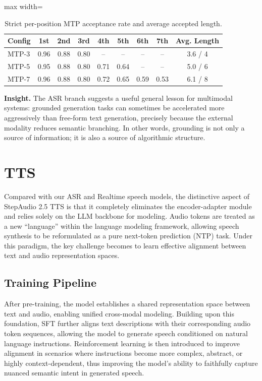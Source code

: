 \documentclass{llmxive}
\begin{document}
\begin{table}[htb]
\centering
\small
\setlength{\tabcolsep}{8pt}
\begin{adjustbox}{max width=\textwidth}
\begin{tabular}{lccccccc|c}
\toprule
Config & 1st & 2nd & 3rd & 4th & 5th & 6th & 7th & Avg. Length \\
\midrule
MTP-3 & 0.96 & 0.88 & 0.80 & -- & -- & -- & -- & 3.6 / 4 \\
MTP-5 & 0.95 & 0.88 & 0.80 & 0.71 & 0.64 & -- & -- & 5.0 / 6 \\
MTP-7 & 0.96 & 0.88 & 0.80 & 0.72 & 0.65 & 0.59 & 0.53 & 6.1 / 8 \\
\bottomrule
\end{tabular}
\end{adjustbox}
\caption{Strict per-position MTP acceptance rate and average accepted length.}
\label{tab:acceptance}
\end{table}


\textbf{Insight.} The ASR branch suggests a useful general lesson for multimodal systems: grounded generation tasks can sometimes be accelerated more aggressively than free-form text generation, precisely because the external modality reduces semantic branching. In other words, grounding is not only a source of information; it is also a source of algorithmic structure.

\section{TTS}
\label{sec:tts}
Compared with our ASR and Realtime speech models, the distinctive aspect of StepAudio 2.5 TTS is that it completely eliminates the encoder-adapter module and relies solely on the LLM backbone for modeling. Audio tokens are treated as a new “language” within the language modeling framework, allowing speech synthesis to be reformulated as a pure next-token prediction (NTP) task. Under this paradigm, the key challenge becomes to learn effective alignment between text and audio representation spaces.
\subsection{Training Pipeline}
\label{sec:pipeline}


After pre-training, the model establishes a shared representation space between text and audio, enabling unified cross-modal modeling. Building upon this foundation, SFT further aligns text descriptions with their corresponding audio token sequences, allowing the model to generate speech conditioned on natural language instructions. Reinforcement learning is then introduced to improve alignment in scenarios where instructions become more complex, abstract, or highly context-dependent, thus improving the model’s ability to faithfully capture nuanced semantic intent in generated speech.
\end{document}
